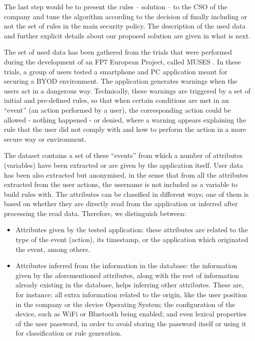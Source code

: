 \documentclass[runningheads]{llncs}
\begin{document}
The last step would be to present the rules -- solution -- to the CSO of the company and tune the algorithm according to the decision of
finally including or not the set of rules in the main security
policy. The description of the used data and further explicit details
about our proposed solution are given in what is next.

\label{subsec:data}

 The set of used data has been gathered from the trials that were performed
 during the development of an FP7 European Project, called MUSES
 \cite{DBLP:conf/sac/MoraCGZJEBAH14}. In these trials, a group of
 users tested a smartphone and PC application meant for securing a
 BYOD environment. The application generates warnings when the users
 act in a dangerous way. Technically, these warnings are triggered by
 a set of initial and pre-defined rules, so that when certain
 conditions are met in an ``event'' (an action performed by a user),
 the corresponding action could be allowed - nothing happened - or
 denied, where a warning appears explaining the rule that the user did not comply with and how to perform the action in a more secure way or environment.

The dataset contains a set of these ``events'' from which a number of attributes (variables) have been extracted or are given by the application itself. User data has been also extracted but anonymised, in the sense that from all the attributes extracted from the user actions, the username is not included as a variable to build rules with. The attributes can be classified in different ways; one of them is based on whether they are directly read from the application or inferred after processing the read data. Therefore, we distinguish between:
\begin{itemize}
  \item Attributes given by the tested application: these attributes
    are related to the type of the event (action), its timestamp, or
    the application which originated the event, among others. 
  \item Attributes inferred from the information in the database: the information given by the aforementioned attributes, along with the rest of information already existing in the database, helps inferring other attributes. These are, for instance: all extra information related to the origin, like the user position in the company or the device Operating System; the configuration of the device, such as WiFi or Bluetooth being enabled; and even lexical properties of the user password, in order to avoid storing the password itself or using it for classification or rule generation.
\end{itemize}
\end{document}
